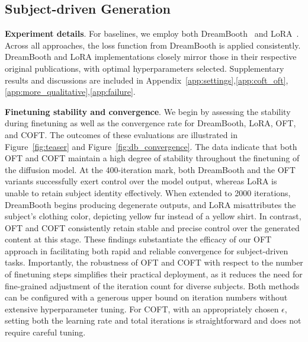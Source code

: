 \subsection{Subject-driven Generation}

\textbf{Experiment details}. For baselines, we employ both DreamBooth~\cite{ruiz2023dreambooth} and LoRA~\cite{hulora2022}. Across all approaches, the loss function from DreamBooth is applied consistently. DreamBooth and LoRA implementations closely mirror those in their respective original publications, with optimal hyperparameters selected. Supplementary results and discussions are included in Appendix~\ref{app:settings},\ref{app:coft_oft},\ref{app:more_qualitative},\ref{app:failure}.

\textbf{Finetuning stability and convergence}. We begin by assessing the stability during finetuning as well as the convergence rate for DreamBooth, LoRA, OFT, and COFT. The outcomes of these evaluations are illustrated in Figure~\ref{fig:teaser} and Figure~\ref{fig:db_convergence}. The data indicate that both OFT and COFT maintain a high degree of stability throughout the finetuning of the diffusion model. At the 400-iteration mark, both DreamBooth and the OFT variants successfully exert control over the model output, whereas LoRA is unable to retain subject identity effectively. When extended to 2000 iterations, DreamBooth begins producing degenerate outputs, and LoRA misattributes the subject’s clothing color, depicting yellow fur instead of a yellow shirt. In contrast, OFT and COFT consistently retain stable and precise control over the generated content at this stage. These findings substantiate the efficacy of our OFT approach in facilitating both rapid and reliable convergence for subject-driven tasks. Importantly, the robustness of OFT and COFT with respect to the number of finetuning steps simplifies their practical deployment, as it reduces the need for fine-grained adjustment of the iteration count for diverse subjects. Both methods can be configured with a generous upper bound on iteration numbers without extensive hyperparameter tuning. For COFT, with an appropriately chosen $\epsilon$, setting both the learning rate and total iterations is straightforward and does not require careful tuning.

